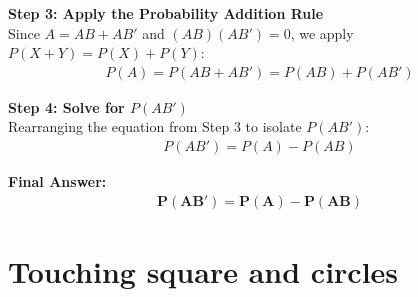 \documentclass[journal,12pt,onecolumn]{IEEEtran}
\newcommand{\brak}[1]{\left(#1\right)}
\theoremstyle{remark}
\begin{document}
\vspace{0.3cm}
\noindent \textbf{Step 3: Apply the Probability Addition Rule} \\
Since $A = AB + AB'$ and $\brak{AB}\brak{AB'} = 0$, we apply $P\brak{X + Y} = P\brak{X} + P\brak{Y}$:
\begin{align}
P\brak{A} = P\brak{AB + AB'} = P\brak{AB} + P\brak{AB'}
\end{align}

\vspace{0.3cm}
\noindent \textbf{Step 4: Solve for $P\brak{AB'}$} \\
Rearranging the equation from Step 3 to isolate $P\brak{AB'}$:
\begin{align}
{P\brak{AB'} = P\brak{A} - P\brak{AB}}
\end{align}

\vspace{0.3cm}
\noindent \textbf{Final Answer:}
\begin{align}
\mathbf{P\brak{AB'} = P\brak{A} - P\brak{AB}}     
\end{align}
\newpage

\section{Touching square and circles}
\end{document}
